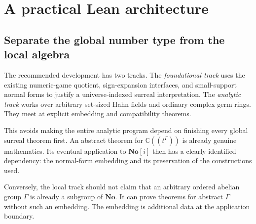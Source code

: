 \documentclass[11pt,letterpaper]{article}
\theoremstyle{definition}
\theoremstyle{remark}
\newcommand{\No}{\mathbf{No}}
\newcommand{\C}{\mathbb C}
\numberwithin{equation}{section}
\begin{document}
\section{A practical Lean architecture}\label{sec:lean-plan}

\subsection{Separate the global number type from the local algebra}
The recommended development has two tracks. The \emph{foundational track} uses the existing numeric-game quotient, sign-expansion interfaces, and small-support normal forms to justify a universe-indexed surreal interpretation. The \emph{analytic track} works over arbitrary set-sized Hahn fields and ordinary complex germ rings. They meet at explicit embedding and compatibility theorems.

This avoids making the entire analytic program depend on finishing every global surreal theorem first. An abstract theorem for \(\C((t^\Gamma))\) is already genuine mathematics. Its eventual application to \(\No[i]\) then has a clearly identified dependency: the normal-form embedding and its preservation of the constructions used.

Conversely, the local track should not claim that an arbitrary ordered abelian group \(\Gamma\) is already a subgroup of \(\No\). It can prove theorems for abstract \(\Gamma\) without such an embedding. The embedding is additional data at the application boundary.

\end{document}
